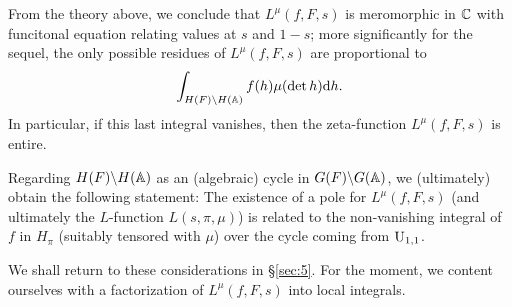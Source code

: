 From the theory above, we conclude that $L^\mu(f, F, s)$ is meromorphic in $\mathbb{C}$ with funcitonal equation relating values at $s$ and $1 - s$; more significantly for the sequel, the only possible residues of $L^\mu(f, F, s)$ are proportional to 
\begin{equation}
    \label{eqn:3.4.1}
    \int_{H(F) \backslash H(\mathbb{A})} f(h) \mu(\det h) \mathrm{d} h.
\end{equation}
In particular, if this last integral vanishes, then the zeta-function $L^\mu(f, F, s)$ is entire.

Regarding $H(F) \backslash H(\mathbb{A})$ as an (algebraic) cycle in $G(F)\backslash G(\mathbb{A})$, we (ultimately) obtain the following statement: The existence of a pole for $L^\mu(f, F, s)$ (and ultimately the $L$-function $L(s, \pi, \mu)$) is related to the non-vanishing integral of $f$ in $H_\pi$ (suitably tensored with $\mu$) over the cycle coming from $\mathrm{U}_{1, 1}$.

We shall return to these considerations in \S \ref{sec:5}.
For the moment, we content ourselves with a factorization of $L^\mu(f, F, s)$ into local integrals.



